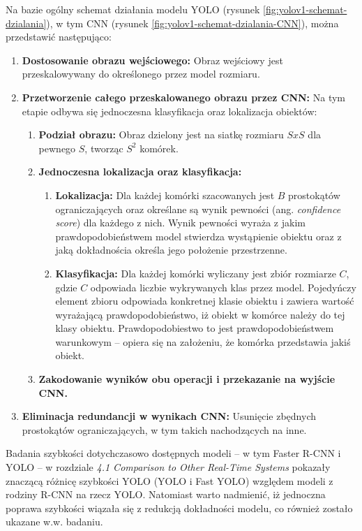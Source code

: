 Na bazie \cite{yolo_pierwszy_artykul} ogólny schemat działania modelu YOLO (rysunek \ref{fig:yolov1-schemat-dzialania}), w tym CNN (rysunek \ref{fig:yolov1-schemat-dzialania-CNN}), można przedstawić następująco:
\begin{enumerate}
    \item \textbf{Dostosowanie obrazu wejściowego:} Obraz wejściowy jest przeskalowywany do określonego przez model rozmiaru.
    \item \textbf{Przetworzenie całego przeskalowanego obrazu przez CNN:} Na tym etapie odbywa się jednoczesna klasyfikacja oraz lokalizacja obiektów:
    \begin{enumerate}
        \item \textbf{Podział obrazu:} Obraz dzielony jest na siatkę rozmiaru $SxS$ dla pewnego $S$, tworząc $S^{2}$ komórek. 
        \item \textbf{Jednoczesna lokalizacja oraz klasyfikacja:} 
        \begin{enumerate}
            \item \textbf{Lokalizacja:} Dla każdej komórki szacowanych jest $B$ prostokątów ograniczających oraz określane są wynik pewności (ang. \emph{confidence score}) dla każdego z nich. Wynik pewności wyraża z jakim prawdopodobieństwem model stwierdza wystąpienie obiektu oraz z jaką dokładnościa określa jego położenie przestrzenne.
            \item \textbf{Klasyfikacja:} Dla każdej komórki wyliczany jest zbiór rozmiarze $C$, gdzie $C$ odpowiada liczbie wykrywanych klas przez model. Pojedyńczy element zbioru odpowiada konkretnej klasie obiektu i zawiera wartość wyrażającą prawdopodobieństwo, iż obiekt w komórce należy do tej klasy obiektu. Prawdopodobiestwo to jest prawdopodobieństwem warunkowym -- opiera się na założeniu, że komórka przedstawia jakiś obiekt. 
        \end{enumerate}
        \item \textbf{Zakodowanie wyników obu operacji i przekazanie na wyjście CNN.}
    \end{enumerate}
    \item  \textbf{Eliminacja redundancji w wynikach CNN:} Usunięcie zbędnych prostokątów ograniczających, w tym takich nachodzących na inne. 
\end{enumerate}

Badania szybkości dotychczasowo dostępnych modeli -- w tym Faster R-CNN i YOLO -- w rozdziale \emph{4.1 Comparison to Other Real-Time Systems} \cite{yolo_pierwszy_artykul} pokazały znaczącą różnicę szybkości YOLO (YOLO i Fast YOLO) względem modeli z rodziny R-CNN na rzecz YOLO. Natomiast warto nadmienić, iż jednoczna poprawa szybkości wiązała się z redukcją dokładności modelu, co również zostało ukazane w.w. badaniu.

